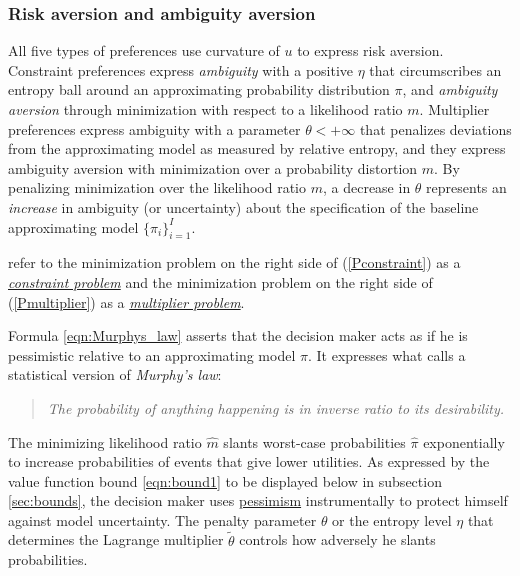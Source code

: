 \subsubsection{Risk aversion and ambiguity aversion}

All five types of preferences use  curvature of $u$ to   express risk aversion.
Constraint preferences  express {\em ambiguity} with a  positive $\eta$ that circumscribes
an entropy ball around an approximating probability distribution $\pi$, and {\em ambiguity aversion}
through  minimization with respect to a  likelihood ratio  $m$. Multiplier
preferences express ambiguity with a  parameter $\theta<+\infty$ that penalizes deviations from the approximating
model as measured by relative entropy, and they express ambiguity aversion with  minimization over a probability
distortion $m$.
By penalizing  minimization over the likelihood ratio $m$, a decrease in $\theta$ represents an {\em increase} in ambiguity (or  uncertainty) about the specification
of the baseline approximating model $\{\pi_i\}_{i=1}^I$.






\begin{remark}
\citet{hsmonograph} refer to the minimization
problem on the right side of (\ref{Pconstraint}) as a \underline{\em constraint problem}
and the minimization problem on the right side of (\ref{Pmultiplier}) as a
\underline{\em multiplier problem}.
\end{remark}



\begin{remark}

Formula  \eqref{eqn:Murphys_law} asserts that the decision maker acts as if he is pessimistic relative
to an approximating model $\pi$. It  expresses what \citet[p.~27]{bucklew2004}
 calls a statistical version of {\em Murphy's law}:
\begin{quote}
 {\em The probability of anything happening is in inverse ratio to its desirability.}
\end{quote}
The minimizing likelihood ratio $\hat m$ slants worst-case probabilities $\hat \pi$ exponentially to increase probabilities of events that give lower utilities.
As expressed by the value function bound \eqref{eqn:bound1} to be  displayed below in subsection \ref{sec:bounds}, the decision maker uses  \underline{pessimism} instrumentally to protect himself against model uncertainty.
The penalty parameter $\theta$ or the entropy level $\eta$ that determines the Lagrange multiplier $\tilde \theta$  controls how adversely he slants probabilities.
\end{remark}

